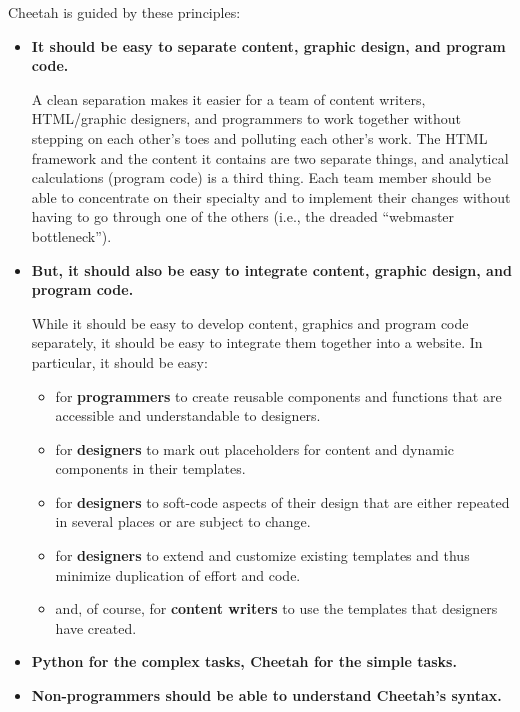 Cheetah is guided by these principles:
\begin{itemize}
\item {\bf It should be easy to separate content, graphic design, and program code.}
     
     A clean separation makes it easier for a team of content writers,
     HTML/graphic designers, and programmers to work together without stepping
     on each other's toes and polluting each other's work.  The HTML framework
     and the content it contains are two separate things, and analytical
     calculations (program code) is a third thing.  Each team member should be
     able to concentrate on their specialty and to implement their changes
     without having to go through one of the others (i.e., the dreaded
     ``webmaster bottleneck'').
     
\item {\bf But, it should also be easy to integrate content, graphic design, and
       program code.}
     
     While it should be easy to develop content, graphics and program
     code separately, it should be easy to integrate them together into a 
     website.  In particular, it should be easy:

     \begin{itemize}
     \item for {\bf programmers} to create reusable components and functions
          that are accessible and understandable to designers.
     \item for {\bf designers} to mark out placeholders for content and 
          dynamic components in their templates.
     \item for {\bf designers} to soft-code aspects of their design that are
          either repeated in several places or are subject to change.
     \item for {\bf designers} to extend and customize existing templates and
          thus minimize duplication of effort and code.
     \item and, of course, for {\bf content writers} to use the templates that
          designers have created.
     \end{itemize}

\item {\bf Python for the complex tasks, Cheetah for the simple tasks.}
     
\item {\bf Non-programmers should be able to understand Cheetah's syntax.}
     
\end{itemize}

